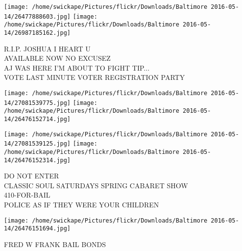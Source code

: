 \documentclass[10pt,letterpaper]{article}
\begin{document}
\texttt{[image: /home/swickape/Pictures/flickr/Downloads/Baltimore 2016-05-14/26477888603.jpg]}
\texttt{[image: /home/swickape/Pictures/flickr/Downloads/Baltimore 2016-05-14/26987185162.jpg]}

R.I.P. JOSHUA I HEART U\\
AVAILABLE NOW NO EXCUSEZ\\
AJ WAS HERE I'M ABOUT TO FIGHT TIP...\\
VOTE LAST MINUTE VOTER REGISTRATION PARTY
\pagebreak

\texttt{[image: /home/swickape/Pictures/flickr/Downloads/Baltimore 2016-05-14/27081539775.jpg]}
\texttt{[image: /home/swickape/Pictures/flickr/Downloads/Baltimore 2016-05-14/26476152714.jpg]}

\texttt{[image: /home/swickape/Pictures/flickr/Downloads/Baltimore 2016-05-14/27081539125.jpg]}
\texttt{[image: /home/swickape/Pictures/flickr/Downloads/Baltimore 2016-05-14/26476152314.jpg]}

DO NOT ENTER\\
CLASSIC SOUL SATURDAYS SPRING CABARET SHOW\\
410{-}FOR{-}BAIL\\
POLICE AS IF THEY WERE YOUR CHILDREN
\pagebreak

\texttt{[image: /home/swickape/Pictures/flickr/Downloads/Baltimore 2016-05-14/26476151694.jpg]}

FRED W FRANK BAIL BONDS
\pagebreak
\end{document}
